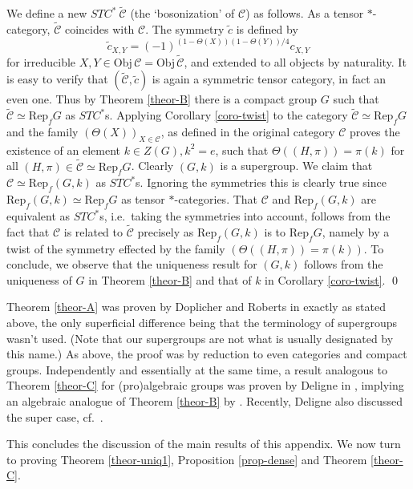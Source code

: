 \documentclass[11pt]{article}
\theoremstyle{definition}
\theoremstyle{definition}
\theoremstyle{remark}
\newcommand{\obj}{\mathrm{Obj}}
\def\2#1{{\mathcal #1}}
\newcommand{\Rep}{\mathrm{Rep}}
\begin{document}
\prf We define a new $STC^*\ \widetilde{\2C}$ (the `bosonization' of $\2C$) as follows. As a 
tensor $*$-category, $\widetilde{\2C}$ coincides with $\2C$. The symmetry $\tilde{c}$ is defined by
\[ \tilde{c}_{X,Y}=(-1)^{(1-\Theta(X))(1-\Theta(Y))/4} c_{X,Y} \]
for irreducible $X,Y\in\obj\,\2C=\obj\,\tilde{\2C}$, and extended to all objects by naturality. It is
easy to verify that $(\tilde{\2C},\tilde{c})$ is again a symmetric tensor category, in fact an even 
one. Thus by Theorem \ref{theor-B} there is a compact group $G$ such that $\tilde{\2C}\simeq\Rep_fG$
as $STC^*$s. Applying Corollary \ref{coro-twist} to the category $\tilde{\2C}\simeq\Rep_fG$ and the
family $(\Theta(X))_{X\in\2C}$, as defined in the original category $\2C$ proves the existence of an
element $k\in Z(G), k^2=e$, such that $\Theta((H,\pi))=\pi(k)$ for all
$(H,\pi)\in\tilde{\2C}\simeq\Rep_fG$. Clearly $(G,k)$ is a supergroup. We claim that
$\2C\simeq\Rep_f(G,k)$ as $STC^*$s. Ignoring the symmetries this is clearly true since
$\Rep_f(G,k)\simeq\Rep_fG$ as tensor $*$-categories. That $\2C$ and $\Rep_f(G,k)$ are equivalent
as $STC^*$s, i.e.\ taking the symmetries into account, follows from the fact that $\2C$ is related
to $\tilde{\2C}$ precisely as $\Rep_f(G,k)$ is to $\Rep_fG$, namely by a twist of the symmetry
effected by the family  $(\Theta((H,\pi))=\pi(k))$. To conclude, we observe that the uniqueness result
for $(G,k)$ follows from the uniqueness of $G$ in Theorem \ref{theor-B} and that of $k$ in Corollary
\ref{coro-twist}. 
\qed

\brem Theorem \ref{theor-A} was proven by Doplicher and Roberts in \cite[Section 7]{DR} exactly as
stated above, the only superficial difference being that the terminology of supergroups wasn't
used. (Note that our supergroups are not what is usually designated by this name.) As above, the
proof was by reduction to even categories and compact groups. Independently and 
essentially at the same time, a result analogous to Theorem \ref{theor-C} for (pro)algebraic groups
was proven by Deligne in \cite{del}, implying an algebraic analogue of Theorem \ref{theor-B} by
\cite{SR,DM}. Recently, Deligne also discussed the super case, cf.\ \cite{del3}.
\erem

This concludes the discussion of the main results of this appendix. We now turn to proving
Theorem \ref{theor-uniq1}, Proposition \ref{prop-dense} and Theorem \ref{theor-C}.


\end{document}
